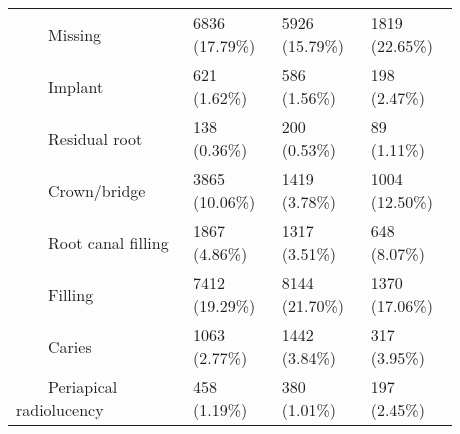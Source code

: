 \begin{table}[t]
\begin{tabular}{ p{0.35\linewidth}p{0.175\linewidth}p{0.175\linewidth}p{0.175\linewidth} }
{~~~~}Missing & \num{6836} (17.79\%) & \num{5926} (15.79\%) & \num{1819} (22.65\%) \\
{~~~~}Implant & \num{621} (1.62\%) & \num{586} (1.56\%) & \num{198} (2.47\%) \\
{~~~~}Residual root & \num{138} (0.36\%) & \num{200} (0.53\%) & \num{89} (1.11\%) \\
{~~~~}Crown/bridge & \num{3865} (10.06\%) & \num{1419} (3.78\%) & \num{1004} (12.50\%) \\
{~~~~}Root canal filling & \num{1867} (4.86\%) & \num{1317} (3.51\%) & \num{648} (8.07\%) \\
{~~~~}Filling & \num{7412} (19.29\%) & \num{8144} (21.70\%) & \num{1370} (17.06\%) \\
{~~~~}Caries & \num{1063} (2.77\%) & \num{1442} (3.84\%) & \num{317} (3.95\%) \\
{~~~~}Periapical radiolucency & \num{458} (1.19\%) & \num{380} (1.01\%) & \num{197} (2.45\%) \\ \bottomrule
\end{tabular}
\end{table}

